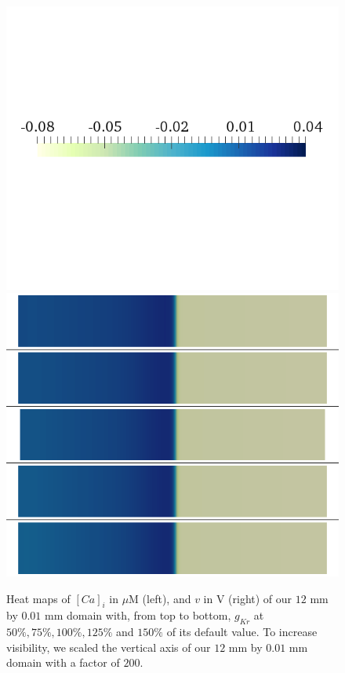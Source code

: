 \documentclass[12pt,a4paper]{article}
\begin{document}
\begin{figure}
\begin{minipage}{0.5\textwidth}
\includegraphics[trim=0cm 7cm 0cm 6cm, clip=true, width=1\linewidth]{legend_v2}
\includegraphics[trim=0cm 0cm 0cm 0cm, clip=true, width=1\linewidth]{v_gkr}
    \end{minipage}
    \caption{Heat maps of $[Ca]_i$ in $\mu$M (left), and $v$ in V (right) of our $12$ mm by $0.01$ mm domain with, from top to bottom, $g_{Kr}$ at $50\%, 75\%, 100\%, 125\%$ and $150\%$ of its default value. To increase visibility, we scaled the vertical axis of our $12$ mm by $0.01$ mm domain with a factor of $200$.}
    \label{fig:1c}
\end{figure}
\end{document}

